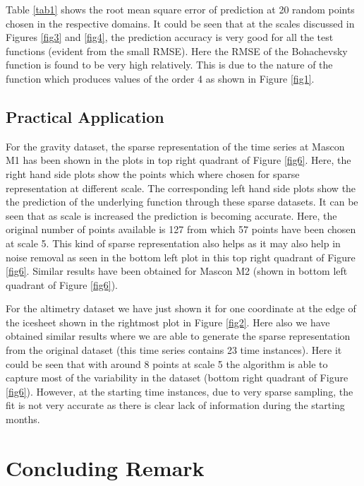 \documentclass[procedia]{easychair}
\begin{document}
Table \ref{tab1} shows the root mean square error of prediction at 20 random points chosen in the respective domains. It could be seen that at the scales discussed in Figures \ref{fig3}  and \ref{fig4}, the prediction accuracy is very good for all the test functions (evident from the small RMSE). Here the RMSE of the Bohachevsky function is found to be very high relatively. This is due to the nature of the function which produces values of the order 4 as shown in Figure \ref{fig1}. 





\subsection{Practical Application}

For the gravity dataset, the sparse representation of the time series at Mascon M1 has been shown in the plots in top right quadrant of Figure \ref{fig6}. Here, the right hand side plots show the points which where chosen for sparse representation at different scale. The corresponding left hand side plots show the the prediction of the underlying function through these sparse datasets. It can be seen that as scale is increased the prediction is becoming accurate. Here, the original number of points available is 127 from which 57 points have been chosen at scale 5. This kind of sparse representation also helps as it may also help in noise removal as seen in the bottom left plot in this top right quadrant of Figure \ref{fig6}. Similar results have been obtained for Mascon M2 (shown in bottom left quadrant of Figure \ref{fig6}).

For the altimetry dataset we have just shown it for one coordinate at the edge of the icesheet shown in the rightmost plot in Figure \ref{fig2}. Here also we have obtained similar results where we are able to generate the sparse representation from the original dataset (this time series contains 23 time instances). Here it could be seen that with around 8 points at scale 5 the algorithm is able to capture most of the variability in the dataset (bottom right quadrant of Figure \ref{fig6}). However, at the starting time instances, due to very sparse sampling, the fit is not very accurate as there is clear lack of information during the starting months.

\section{Concluding Remark} 
\end{document}

